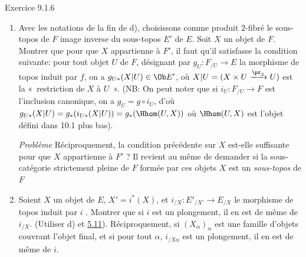 \begin{enonce*}[remark]{Exercice 9.1.6}
\begin{enumerate}
\item Avec les notations de la fin de d), choisissons comme produit
$2$-fibré le sous-topos de $F$ image inverse du sous-topos $E'$ de
$E$. Soit $X$ un objet de $F$. Montrer que pour que $X$ appartienne
à $F'$, il faut qu'il satisfasse la condition suivante: pour tout
objet $U$ de $F$, désignant par $g_U:F_{/U}\rightarrow E$ la
morphisme de topos induit par $f$, on a $g_{U\ast}(X| U)\in \Ob E'$,
où $X| U=(X\times U\xrightarrow{\pr_2}U)$ est la « restriction de
$X$ à $U$ ». (NB: On peut noter que si $i_U:F_{/U}\rightarrow F$
est l'inclusion canonique, on a $g_U=g\circ i_U$, d'où $g_{U\ast}(X|
U)=g_{\ast}(i_{U\ast}(X| U))=g_{\ast}(\Hhom(U,X))$ où $\Hhom(U,X)$
est l'objet défini dans 10.1 plus bas).

\noindent \emph{Problème} Réciproquement, la condition précédente
sur $X$ est-elle suffisante pour que $X$ appartienne à $F'$ ? Il
revient au même de demander si la sous-catégorie strictement pleine
de $F$ formée par ces objets $X$ est un \emph{sous-topos} de $F$

\item Soient $X$ un objet de $E$, $X'=i^{\ast}(X)$, et
$i_{/X}:E'_{/X'}\rightarrow E_{/X}$ le morphisme de topos induit par
$i$ . Montrer que si $i$ est un plongement, il en est
de même de $i_{/X}$. (Utiliser d) et \hyperref[IV.prop5.11]{5.11}).
Réciproquement, si $(X_{\alpha})_{\alpha}$ est une famille d'objets
couvrant l'objet final, et si pour tout $\alpha$, $i_{/X\alpha}$ est
un plongement, il en est de même de $i$.
\end{enumerate}
\end{enonce*}

